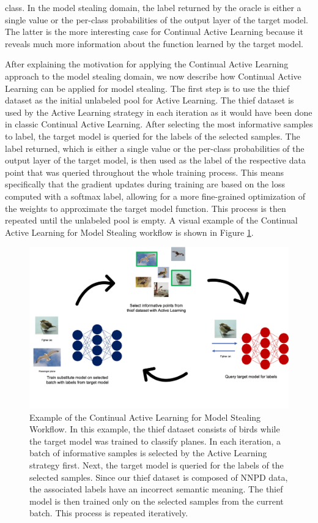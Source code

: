 class. In the model stealing domain, the label returned by the oracle is either a single value or the per-class probabilities of the output layer of the target model.
The latter is the more interesting case for Continual Active Learning because it reveals much more information about the function learned by the target model. \par
After explaining the motivation for applying the Continual Active Learning approach to the model stealing domain, we now describe how Continual Active Learning can be
applied for model stealing. The first step is to use the thief dataset as the initial unlabeled pool for Active Learning. The thief dataset is used by the Active Learning
strategy in each iteration as it would have been done in classic Continual Active Learning. After selecting the most informative samples to label, the target model is
queried for the labels of the selected samples. The label returned, which is either a single value or the per-class probabilities of the output layer of the target model,
is then used as the label of the respective data point that was queried throughout the whole training process. This means specifically that the gradient updates during 
training are based on the loss computed with a softmax label, allowing for a more fine-grained optimization of the weights to approximate the target model function. This
process is then repeated until the unlabeled pool is empty. A visual example of the Continual Active Learning for Model Stealing workflow is shown in Figure
\ref{fig:CalmsWorkflow}. \par
\begin{figure}[ht]
    \centering
    \includegraphics[width=.9\linewidth]{images/Calms_workflow.png}
    \caption[Continual Active Learning for Model Stealing Workflow]{Example of the Continual Active Learning for Model Stealing Workflow. In this example, the thief
    dataset consists of birds while the target model was trained to classify planes. In each iteration, a batch of informative samples is selected by the Active Learning
    strategy first. Next, the target model is queried for the labels of the selected samples. Since our thief dataset is composed of NNPD data, the associated labels have
    an incorrect semantic meaning. The thief model is then trained only on the selected samples from the current batch. This process is repeated iteratively.}
    \label{fig:CalmsWorkflow}
\end{figure}

